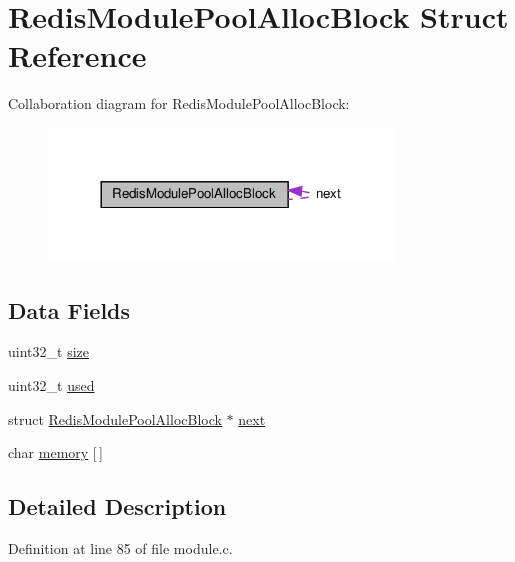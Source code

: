 \hypertarget{struct_redis_module_pool_alloc_block}{}\section{Redis\+Module\+Pool\+Alloc\+Block Struct Reference}
\label{struct_redis_module_pool_alloc_block}


Collaboration diagram for Redis\+Module\+Pool\+Alloc\+Block\+:
\nopagebreak
\begin{figure}[H]
\begin{center}
\leavevmode
\includegraphics[width=260pt]{struct_redis_module_pool_alloc_block__coll__graph}
\end{center}
\end{figure}
\subsection*{Data Fields}
\begin{DoxyCompactItemize}
\item 
uint32\+\_\+t \hyperlink{struct_redis_module_pool_alloc_block_ab2c6b258f02add8fdf4cfc7c371dd772}{size}
\item 
uint32\+\_\+t \hyperlink{struct_redis_module_pool_alloc_block_a5e1ebda31e026934b2091d2d0051818a}{used}
\item 
struct \hyperlink{struct_redis_module_pool_alloc_block}{Redis\+Module\+Pool\+Alloc\+Block} $\ast$ \hyperlink{struct_redis_module_pool_alloc_block_a5fa550c949f7683ab1f8d863a5f6e520}{next}
\item 
char \hyperlink{struct_redis_module_pool_alloc_block_ad09e0c27a11985525508a158c3fc3bfc}{memory} \mbox{[}$\,$\mbox{]}
\end{DoxyCompactItemize}


\subsection{Detailed Description}


Definition at line 85 of file module.\+c.



